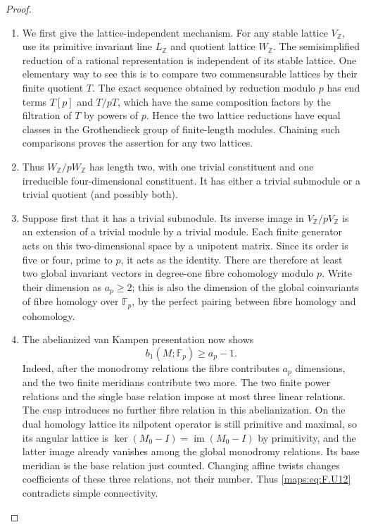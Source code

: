 \documentclass[11pt,a4paper]{article}
\theoremstyle{definition}
\begin{document}
\begin{proof}
\begin{enumerate}[label=\arabic*.]
\item We first give the lattice-independent mechanism.  For any
stable lattice $V_\mathbb Z$, use its primitive invariant
line $L_\mathbb Z$ and quotient lattice $W_\mathbb Z$.
The semisimplified reduction of a rational representation is
independent of its stable lattice.  One elementary way to see
this is to compare two commensurable lattices by their finite
quotient $T$.  The exact sequence obtained by reduction modulo
$p$ has end terms $T[p]$ and $T/pT$, which have the same
composition factors by the filtration of $T$ by powers of $p$.
Hence the two lattice reductions have equal classes in the
Grothendieck group of finite-length modules.  Chaining such
comparisons proves the assertion for any two lattices.

\item Thus $W_\mathbb Z/pW_\mathbb Z$ has length two, with one
trivial constituent and one irreducible four-dimensional
constituent.  It has either a trivial submodule or a trivial
quotient (and possibly both).

\item Suppose first that it has a trivial submodule.  Its inverse
image in $V_\mathbb Z/pV_\mathbb Z$ is an extension of a
trivial module by a trivial module.  Each finite generator
acts on this two-dimensional space by a unipotent matrix.
Since its order is five or four, prime to $p$, it acts as
the identity.  There are therefore at least two global
invariant vectors in degree-one fibre cohomology modulo $p$.
Write their dimension as $a_p\ge2$; this is also the
dimension of the global coinvariants of fibre homology over
$\mathbb F_p$, by the perfect pairing between fibre homology
and cohomology.

\item The abelianized van Kampen presentation now shows
\[
 b_1(M;\mathbb F_p)\ge a_p-1.
 \tag{F.U12}\label{maps:eq:F.U12}
\]
Indeed, after the monodromy relations the fibre contributes
$a_p$ dimensions, and the two finite meridians contribute
two more.  The two finite power relations and the single
base relation impose at most three linear relations.
The cusp introduces no further fibre relation in this
abelianization.  On the dual homology lattice its nilpotent
operator is still primitive and maximal, so its angular lattice is
$\ker(M_0-I)=\operatorname{im}(M_0-I)$ by primitivity, and
the latter image already vanishes among the global
monodromy relations.  Its base meridian is the base relation
just counted.  Changing affine twists changes coefficients
of these three relations, not their number.  Thus \eqref{maps:eq:F.U12}
contradicts simple connectivity.


\end{enumerate}
\end{proof}
\end{document}
